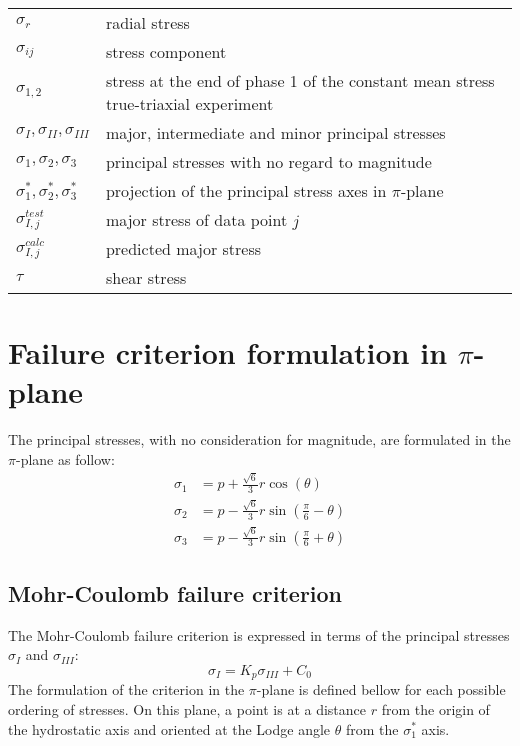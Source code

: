 \begin{table}
\begin{tabular}{ll}
        $\sigma_r$ & radial stress \\
        $\sigma_{ij}$ & stress component \\
        $\sigma_{1,2}$ & stress at the end of phase 1 of the constant mean stress true-triaxial experiment \\
        $\sigma_{I},\sigma_{II},\sigma_{III} $ & major, intermediate and minor principal stresses\\
        $\sigma_{1},\sigma_{2},\sigma_{3} $ & principal stresses with no regard to magnitude\\
        $\sigma_{1}^*,\sigma_{2}^*,\sigma_{3}^* $ & projection of the principal stress axes in $\pi$-plane \\
        $\sigma_{I,j}^{test}$ & major stress of data point $j$ \\
        $\sigma_{I,j}^{calc}$ & predicted major stress \\
        $\tau$ & shear stress \\
    \end{tabular}
\end{table}

\chapter{Failure criterion formulation in \texorpdfstring{$\pi$}{pi}-plane}

The principal stresses, with no consideration for magnitude, are formulated in the $\pi$-plane as follow: 
\begin{align}
    \sigma_1 &= p + \frac{\sqrt{6}}{3}r\cos\left(\theta\right) \label{eq2:sig1}\\
    \sigma_2 &= p - \frac{\sqrt{6}}{3}r\sin\left(\frac{\pi}{6}-\theta\right)\\
    \sigma_3 &= p - \frac{\sqrt{6}}{3}r\sin\left(\frac{\pi}{6}+\theta\right) \label{eq2:sig3}
\end{align}

\section*{Mohr-Coulomb failure criterion}
The Mohr-Coulomb failure criterion is expressed in terms of the principal stresses $\sigma_I$ and $\sigma_{III}$:
\begin{equation}
    \sigma_I = K_p \sigma_{III} + C_0
\end{equation}
The formulation of the criterion in the $\pi$-plane is defined bellow for each possible ordering of stresses. On this plane, a point is at a distance $r$ from the origin of the hydrostatic axis and oriented at the Lodge angle $\theta$ from the  $\sigma_1^*$ axis.

